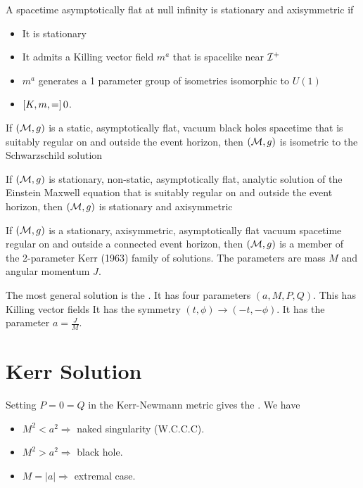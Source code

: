 \documentclass{article}
\begin{document}
\begin{definition}
A spacetime asymptotically flat at null infinity is stationary and axisymmetric if 
\begin{itemize}
    \item It is stationary
    \item It admits a Killing vector field $m^a$ that is spacelike near $\mc{I}^+$
    \item $m^a$ generates a 1 parameter group of isometries isomorphic to $U(1)$
    \item $\comm[K,m]=0$.
\end{itemize}
\end{definition}

\begin{theorem}
If $(\mc{M},g)$ is a static, asymptotically flat, vacuum black holes spacetime that is suitably regular on and outside the event horizon, then $(\mc{M},g)$ is isometric to the Schwarzschild solution
\end{theorem}

\begin{theorem}
If $(\mc{M},g)$ is stationary, non-static, asymptotically flat, analytic solution of the Einstein Maxwell equation that is suitably regular on and outside the event horizon, then $(\mc{M},g)$ is stationary and axisymmetric
\end{theorem}

\begin{theorem}[1971 ,Robinson 1975]
If $(\mc{M},g)$ is a stationary, axisymmetric, asymptotically flat vacuum spacetime regular on and outside a connected event horizon, then $(\mc{M},g)$ is a member of the 2-parameter Kerr (1963) family of solutions. The parameters are mass $M$ and angular momentum $J$. 
\end{theorem}

The most general solution is the . It has four parameters $(a,M,P,Q)$. 
This has Killing vector fields 
It has the symmetry $(t,\phi) \to (-t, -\phi)$. It has the parameter $a=\frac{J}{M}$. 

\section{Kerr Solution}
Setting $P = 0 = Q$ in the Kerr-Newmann metric gives the . We have 
\begin{itemize}
    \item $M^2 < a^2 \Rightarrow$ naked singularity (W.C.C.C).
    \item $M^2 > a^2 \Rightarrow$ black hole.
    \item $M = |a| \Rightarrow$ extremal case. 
\end{itemize}
\end{document}
